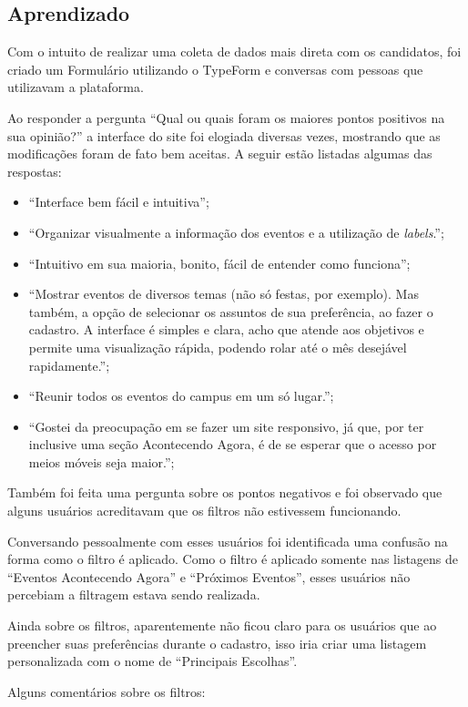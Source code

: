 \subsection{Aprendizado}
\par Com o intuito de realizar uma coleta de dados mais direta com os candidatos, foi criado um Formulário utilizando o TypeForm e conversas com pessoas que utilizavam a plataforma.
\par Ao responder a pergunta ``Qual ou quais foram os maiores pontos positivos na sua opinião?'' a interface do site foi elogiada diversas vezes, mostrando que as modificações foram de fato bem aceitas. A seguir estão listadas algumas das respostas:
\begin{itemize}
\item ``Interface bem fácil e intuitiva'';
\item ``Organizar visualmente a informação dos eventos e a utilização de \emph{labels}.'';
\item ``Intuitivo em sua maioria, bonito, fácil de entender como funciona'';
\item ``Mostrar eventos de diversos temas (não só festas, por exemplo). Mas também, a
opção de selecionar os assuntos de sua preferência, ao fazer o cadastro. A interface é simples e clara, acho que atende aos objetivos e permite uma visualização rápida, podendo rolar até o mês desejável rapidamente.'';
\item ``Reunir todos os eventos do campus em um só lugar.'';
\item ``Gostei da preocupação em se fazer um site responsivo, já que, por ter inclusive uma seção Acontecendo Agora, é de se esperar que o acesso por meios móveis seja maior.'';
\end{itemize}
\par Também foi feita uma pergunta sobre os pontos negativos e foi observado que alguns usuários acreditavam que os filtros não estivessem funcionando.
\par Conversando pessoalmente com esses usuários foi identificada uma confusão na forma como o filtro é aplicado. Como o filtro é aplicado somente nas listagens de ``Eventos Acontecendo Agora'' e ``Próximos Eventos'', esses usuários não percebiam a filtragem estava sendo realizada.
\par Ainda sobre os filtros, aparentemente não ficou claro para os usuários que ao preencher suas preferências durante o cadastro, isso iria criar uma listagem personalizada com o nome de ``Principais Escolhas''.
\par Alguns comentários sobre os filtros:
